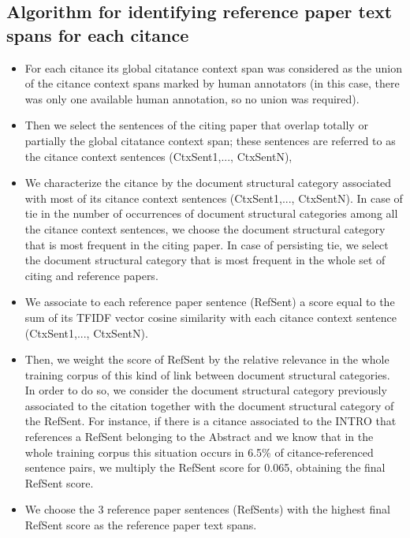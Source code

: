 \documentclass[11pt]{article}
\begin{document}
\subsection{ Algorithm for identifying reference paper text spans for each citance}
\begin{itemize}
\item{For each citance its global citatance context span was considered as the union of the citance context spans} marked by human annotators (in this case, there was only one available human annotation, so no union was required).
\item{Then we select the sentences of the citing paper} that overlap totally or partially the global citatance context span; these sentences are referred to as the citance context sentences (CtxSent1,..., CtxSentN),
\item{We characterize the citance by the document structural category associated with most of its citance context sentences (CtxSent1,..., CtxSentN)}. In case of tie in the number of occurrences of document structural categories among all the citance context sentences, we choose the document structural category that is most frequent in the citing paper. In case of persisting tie, we select the document structural category that is most frequent in the whole set of citing and reference papers.
\item{We associate to each reference paper sentence (RefSent) a score} equal to the sum of its TFIDF vector cosine similarity with each citance context sentence (CtxSent1,..., CtxSentN).
\item{Then, we weight the score of RefSent by the relative relevance in the whole training corpus} of this kind of link between document structural categories. In order to do so, we consider the document structural category previously associated to the citation together with the document structural category of the RefSent. For instance, if there is a citance associated to the INTRO that references a RefSent belonging to the Abstract and we know that in the whole training corpus this situation occurs in 6.5\% of citance-referenced sentence pairs, we multiply the RefSent score for 0.065, obtaining the final RefSent score.
\item{We choose the 3 reference paper sentences} (RefSents) with the highest final RefSent score as the reference paper text spans.
\end{itemize}
\end{document}
